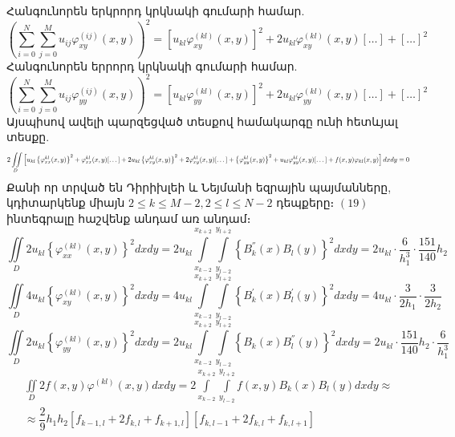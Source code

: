 \documentclass[fleqn, bachelor,subf,12pt,notitlepage]{article}
\newcommand\scalemath[2]{\scalebox{#1}{\mbox{\ensuremath{\displaystyle #2}}}}
\begin{document}
Հանգունորեն երկրորդ կրկնակի գումարի համար.
$$\left(\sum_{i=0}^{N} \sum_{j=0}^{M}u_{ij}\varphi_{xy}^{(ij)}(x,y)\right)^2 = \left[u_{kl}\varphi_{xy}^{(kl)}(x,y)\right]^{2} + 2u_{kl}\varphi_{xy}^{(kl)}(x,y)[\dots] + [\dots]^2$$
Հանգունորեն երրորդ կրկնակի գումարի համար.
$$\left(\sum_{i=0}^{N} \sum_{j=0}^{M}u_{ij}\varphi_{yy}^{(ij)}(x,y)\right)^2 = \left[u_{kl}\varphi_{yy}^{(kl)}(x,y)\right]^{2} + 2u_{kl}\varphi_{yy}^{(kl)}(x,y)[\dots] + [\dots]^2$$
Այսպիսով ավելի պարզեցված տեսքով համակարգը ունի հետևյալ տեսքը.
\begin{equation}\scalemath{0.65}{2\iint \limits_{D} \left[u_{kl}\left\{ \varphi_{xx}^{kl}(x,y)\right\}^{2} + \varphi_{xx}^{kl}(x,y)[\dots] + 2u_{kl}\left\{ \varphi_{xy}^{kl}(x,y)\right\}^{2} + 2\varphi_{xy}^{kl}(x,y)[\dots] +\left\{ \varphi_{yy}^{kl}(x,y)\right\}^{2} +u_{kl}\varphi_{yy}^{kl}(x,y)[\dots] +f(x,y)\varphi_{kl}(x,y)\right]dxdy=0}\end{equation}
Քանի որ տրված են Դիրիխլեի և Նեյմանի եզրային պայմանները, կդիտարկենք միայն $2 \leq k \leq M-2, 2 \leq l \leq N-2$ դեպքերը։
$\left(19\right)$ ինտեգրալը հաշվենք անդամ առ անդամ։
\begin{equation}
\iint \limits_{D} 2u_{kl}\left\{ \varphi_{xx}^{(kl)}(x,y)\right\}^{2}dxdy=2u_{kl}\int \limits_{x_{k-2}}^{x_{k+2}}\int \limits_{y_{l-2}}^{y_{l+2}} \left\{ B_{k}^{''}(x)B_{l}(y)\right\}^{2}dxdy=2u_{kl}\cdot \dfrac{6}{h_{1}^{3}} \cdot \dfrac{151}{140}h_{2}
\end{equation}
\begin{equation}\iint \limits_{D} 4u_{kl}\left\{ \varphi_{xy}^{(kl)}(x,y)\right\}^{2}dxdy=4u_{kl}\int \limits_{x_{k-2}}^{x_{k+2}}\int \limits_{y_{l-2}}^{y_{l+2}} \left\{ B_{k}^{'}(x)B_{l}^{'}(y)\right\}^{2}dxdy=4u_{kl}\cdot \dfrac{3}{2h_{1}} \cdot \dfrac{3}{2h_{2}}
\end{equation}
\begin{equation}
\iint \limits_{D} 2u_{kl}\left\{ \varphi_{yy}^{(kl)}(x,y)\right\}^{2}dxdy=2u_{kl}\int \limits_{x_{k-2}}^{x_{k+2}}\int \limits_{y_{l-2}}^{y_{l+2}} \left\{ B_{k}(x)B_{l}^{''}(y)\right\}^{2}dxdy=2u_{kl}\cdot \dfrac{151}{140}h_{2} \cdot \dfrac{6}{h_{1}^{3}}
\end{equation}
\begin{equation}
\begin{split}
\iint \limits_{D} 2f(x,y) \varphi^{(kl)}(x,y)dxdy = 2 \int \limits_{x_{k-2}}^{x_{k+2}}\int \limits_{y_{l-2}}^{y_{l+2}}f(x,y)B_{k}(x)B_{l}(y)dxdy\approx \\
\approx \dfrac{2}{9} h_{1}h_{2} \left[f_{k-1,l}+2f_{k,l}+f_{k+1,l}\right] \left[f_{k,l-1}+2f_{k,l}+f_{k,l+1}\right]
\end{split}
\end{equation}
\end{document}
